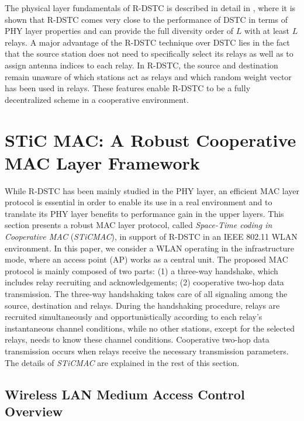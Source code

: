 \documentclass[peerreview,draftcls,onecolumn,12pt,a4paper]{IEEEtran}
\begin{document}
The physical layer fundamentals of R-DSTC is described in detail
in \cite{sirkeci_scaglione_mergen_2007_SP}, where it is shown that
R-DSTC comes very close to the performance of DSTC in terms of PHY
layer properties and can provide the full diversity order of $L$
with at least $L$ relays. A major advantage of the R-DSTC
technique over DSTC lies in the fact that the source station does
not need to specifically select its relays as well as to assign
antenna indices to each relay. In R-DSTC, the source and
destination remain unaware of which stations act as relays and
which random weight vector has been used in relays. These features
enable R-DSTC to be a fully decentralized scheme in a cooperative
environment.


\vspace{-0.2in}
\section{ST\MakeLowercase{i}C MAC: A Robust Cooperative MAC Layer Framework}
\label{WLAN-MAC-R-DSTC}

While R-DSTC has been mainly studied in
the PHY layer, an efficient MAC layer protocol is essential in
order to enable its use in a real environment and to translate its
PHY layer benefits to performance gain in the upper layers. This
section presents a robust MAC layer protocol, called
\emph{Space-Time coding in Cooperative MAC} (\emph{STiCMAC}), in
support of R-DSTC in an IEEE 802.11 WLAN environment. In this
paper, we consider a WLAN operating in the infrastructure mode,
where an access point (AP) works as a central unit. The proposed
MAC protocol is mainly composed of two parts: (1) a three-way
handshake, which includes relay recruiting and acknowledgements;
(2) cooperative two-hop data transmission. The three-way
handshaking takes care of all signaling among the source,
destination and relays. During the handshaking procedure, relays
are recruited simultaneously and opportunistically according to
each relay's instantaneous channel conditions, while no other stations, except for the selected relays, needs to know these channel conditions. Cooperative two-hop data
transmission occurs when relays receive the necessary transmission
parameters. The details of \emph{STiCMAC} are explained in the
rest of this section.

\vspace{-0.15in}
\subsection{Wireless LAN Medium Access Control Overview}
\label{WLAN-DCF}
\vspace{-0.05in}
\end{document}

